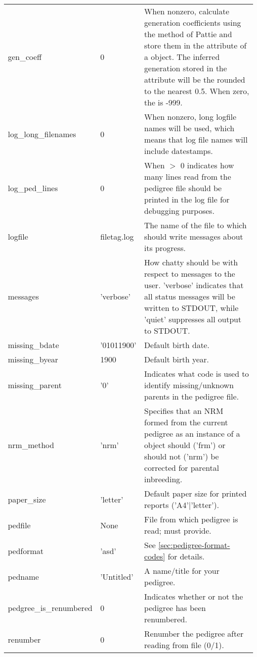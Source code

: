 \begin{center}
\begin{supertabular}{l|l|p{4in}}
    gen\_coeff       & 0            & When nonzero, calculate generation coefficients using the method of Pattie \citeyear{Pattie1965} and store them in the  attribute of a  object.  The inferred generation stored in the  attribute will be the  rounded to the nearest 0.5.  When zero, the  is -999. \\
    log\_long\_filenames & 0            & When nonzero, long logfile names will be used, which means that log file names will include datestamps. \\
    log\_ped\_lines  & 0            & When $>$ 0 indicates how many lines read from the pedigree file should be printed in the log file for debugging purposes. \\
    logfile          & filetag.log  & The name of the file to which \PyPedal{} should write messages about its progress. \\
    messages         & 'verbose'    & How chatty \PyPedal{} should be with respect to messages to the user.  'verbose' indicates that all status messages will be written to STDOUT, while 'quiet' suppresses all output to STDOUT. \\
    missing_bdate    & '01011900'   & Default birth date. \\
    missing_byear    & 1900         & Default birth year.\\
    missing\_parent  & '0'          & Indicates what code is used to identify missing/unknown parents in the pedigree file. \\
    nrm\_method      & 'nrm'        & Specifies that an NRM formed from the current pedigree as an instance of a  object should ('frm') or should not ('nrm') be corrected for parental inbreeding. \\
    paper_size       & 'letter'     & Default paper size for printed reports ('A4'|'letter'). \\
    pedfile          & None         & File from which pedigree is read; must provide. \\
    pedformat        & 'asd'        & See \ref{sec:pedigree-format-codes} for details. \\
    pedname          & 'Untitled'   & A name/title for your pedigree. \\
    pedgree\_is\_renumbered & 0     & Indicates whether or not the pedigree has been renumbered. \\
    renumber         & 0            & Renumber the pedigree after reading from file (0/1). \\

\end{supertabular}
\end{center}
